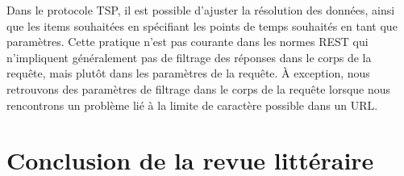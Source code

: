 Dans le protocole TSP, il est possible d'ajuster la résolution des données, ainsi que les items souhaitées en spécifiant les points de temps souhaités en tant que paramètres. Cette pratique n'est pas courante dans les normes REST qui n'impliquent généralement pas de filtrage des réponses dans le corps de la requête, mais plutôt dans les paramètres de la requête. À exception, nous retrouvons des paramètres de filtrage dans le corps de la requête lorsque nous rencontrons un problème lié à la limite de caractère possible dans un URL.





\section{Conclusion de la revue littéraire}







